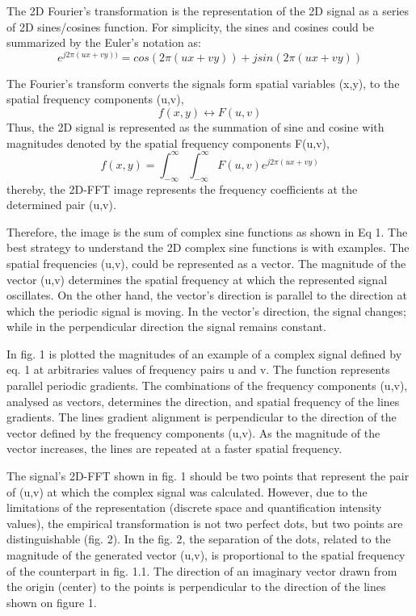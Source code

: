 \documentclass[12pt,a4paper]{article}
\begin{document}
The 2D Fourier's transformation is the representation of the 2D signal as a series of 2D sines/cosines function. For simplicity, the sines and cosines could be summarized by the Euler’s notation as:
\begin{equation}
e^{j2\pi(ux+vy))}=cos(2\pi(ux+vy))+jsin(2\pi(ux+vy))
\end{equation}

The Fourier’s transform converts the signals form spatial variables (x,y), to the spatial frequency components (u,v),
\begin{equation}
f(x,y)\leftrightarrow F(u,v)
\end{equation}
Thus, the 2D signal is represented as the summation of sine and cosine with magnitudes denoted by the spatial frequency components F(u,v),  
\begin{equation}
f(x,y)=\int_{-\infty}^{\infty}\int_{-\infty}^{\infty}F(u,v)e^{j2\pi(ux+vy)}
\end{equation}
thereby, the 2D-FFT image represents the frequency  coefficients at the determined pair (u,v). 

Therefore, the image is the sum of complex sine functions as shown in Eq 1. The best strategy to understand the 2D complex sine functions is with examples. The spatial frequencies (u,v), could be represented as a vector. The magnitude of the vector (u,v) determines the spatial frequency at which the represented signal oscillates. On the other hand, the vector's direction is parallel to the direction at which the periodic signal is moving. In the vector's direction, the signal changes; while in the perpendicular direction the signal remains constant. 

In fig. 1 is plotted the magnitudes of an example of a complex signal defined by eq. 1 at arbitraries values of frequency pairs u and v. The function represents parallel periodic gradients. The combinations of the frequency components (u,v), analysed as vectors, determines the direction, and spatial frequency of the lines gradients. The lines gradient alignment is perpendicular to the direction of the vector defined by the frequency components (u,v). As the magnitude of the vector increases, the lines are repeated at a faster spatial frequency. 

The signal's 2D-FFT shown in fig. 1 should be two points that represent the pair of (u,v) at which the complex signal was calculated. However, due to the limitations of the representation (discrete space and quantification intensity values), the empirical transformation is not two perfect dots, but two points are distinguishable (fig. 2). In the fig. 2, the separation of the dots, related to the magnitude of the generated vector (u,v), is proportional to the spatial frequency of the counterpart in fig. 1.1.  The direction of an imaginary vector drawn from the origin (center) to the points is perpendicular to the direction of the lines shown on figure 1. 
\end{document}
